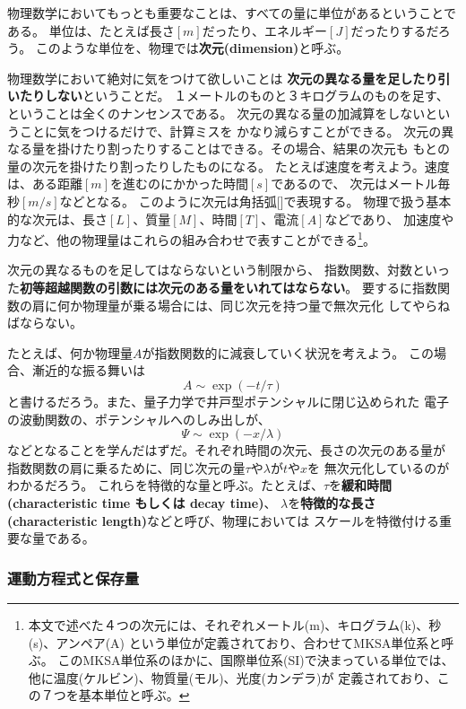\documentclass{jarticle}
\begin{document}
物理数学においてもっとも重要なことは、すべての量に単位があるということである。
単位は、たとえば長さ$[m]$だったり、エネルギー$[J]$だったりするだろう。
このような単位を、物理では{\bf 次元(dimension)}と呼ぶ。

物理数学において絶対に気をつけて欲しいことは
{\bf 次元の異なる量を足したり引いたりしない}ということだ。
１メートルのものと３キログラムのものを足す、ということは全くのナンセンスである。
次元の異なる量の加減算をしないということに気をつけるだけで、計算ミスを
かなり減らすことができる。
次元の異なる量を掛けたり割ったりすることはできる。その場合、結果の次元も
もとの量の次元を掛けたり割ったりしたものになる。
たとえば速度を考えよう。速度は、ある距離$[m]$を進むのにかかった時間$[s]$であるので、
次元はメートル毎秒$[m/s]$などとなる。
このように次元は角括弧[]で表現する。
物理で扱う基本的な次元は、長さ$[L]$、質量$[M]$、時間$[T]$、電流$[A]$などであり、
加速度や力など、他の物理量はこれらの組み合わせで表すことができる\footnote{
  本文で述べた４つの次元には、それぞれメートル(m)、キログラム(k)、秒(s)、アンペア(A)
  という単位が定義されており、合わせてMKSA単位系と呼ぶ。
  このMKSA単位系のほかに、国際単位系(SI)で決まっている単位では、他に温度(ケルビン)、物質量(モル)、光度(カンデラ)が
  定義されており、この７つを基本単位と呼ぶ。}。

次元の異なるものを足してはならないという制限から、
指数関数、対数といった{\bf 初等超越関数の引数には次元のある量をいれてはならない}。
要するに指数関数の肩に何か物理量が乗る場合には、同じ次元を持つ量で無次元化
してやらねばならない。

たとえば、何か物理量$A$が指数関数的に減衰していく状況を考えよう。
この場合、漸近的な振る舞いは
\begin{equation}
  A \sim \exp(-t/\tau)
\end{equation}
と書けるだろう。また、量子力学で井戸型ポテンシャルに閉じ込められた
電子の波動関数の、ポテンシャルへのしみ出しが、
\begin{equation}
  \Psi \sim \exp(-x/\lambda)
\end{equation}
などとなることを学んだはずだ。それぞれ時間の次元、長さの次元のある量が
指数関数の肩に乗るために、同じ次元の量$\tau$や$\lambda$が$t$や$x$を
無次元化しているのがわかるだろう。
これらを特徴的な量と呼ぶ。たとえば、$\tau$を{\bf 緩和時間 (characteristic time もしくは decay time)}、
$\lambda$を{\bf 特徴的な長さ (characteristic length)}などと呼び、物理においては
スケールを特徴付ける重要な量である。

\subsubsection{運動方程式と保存量}
\end{document}
